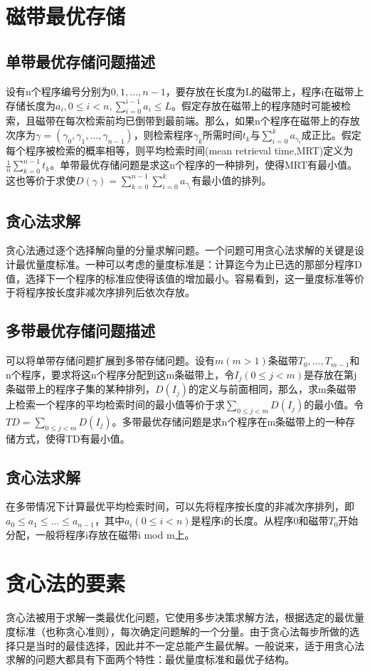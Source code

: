 \section{磁带最优存储}
\subsection*{单带最优存储问题描述}
设有n个程序编号分别为$0,1,\dots, n-1$，要存放在长度为L的磁带上，程序i在磁带上存储长度为$a_i,0\leq i<n,\sum_{i=0}^{i-1}a_i\leq L$。假定存放在磁带上的程序随时可能被检索，且磁带在每次检索前均已倒带到最前端。那么，如果n个程序在磁带上的存放次序为$\gamma=(\gamma_0,\gamma_1,\dots,\gamma_{n-1})$，则检索程序$\gamma_k$所需时间$t_k$与$\sum_{i=0}^{k}a_{\gamma_i}$成正比。假定每个程序被检索的概率相等，则平均检索时间(mean retrieval time,MRT)定义为$\frac{1}{n}\sum_{k=0}^{n-1}t_k$。单带最优存储问题是求这n个程序的一种排列，使得MRT有最小值。这也等价于求使$D(\gamma)=\sum_{k=0}^{n-1}\sum_{i=0}^{k}a_{\gamma_i}$有最小值的排列。
\subsection*{贪心法求解}
贪心法通过逐个选择解向量的分量求解问题。一个问题可用贪心法求解的关键是设计最优量度标准。一种可以考虑的量度标准是：计算迄今为止已选的那部分程序D值，选择下一个程序的标准应使得该值的增加最小。容易看到，这一量度标准等价于将程序按长度非减次序排列后依次存放。
\subsection*{多带最优存储问题描述}
可以将单带存储问题扩展到多带存储问题。设有$m(m>1)$条磁带$T_0,\dots,T_{m-1}$和n个程序，要求将这n个程序分配到这m条磁带上，令$I_j(0\leq j<m)$是存放在第j条磁带上的程序子集的某种排列，$D(I_j)$的定义与前面相同，那么，求m条磁带上检索一个程序的平均检索时间的最小值等价于求$\sum_{0\leq j<m}D(I_j)$的最小值。令$TD=\sum_{0\leq j<m}D(I_j)$。多带最优存储问题是求n个程序在m条磁带上的一种存储方式，使得TD有最小值。
\subsection*{贪心法求解}
在多带情况下计算最优平均检索时间，可以先将程序按长度的非减次序排列，即$a_0\leq a_1\leq \dots\leq a_{n-1}$，其中$a_i(0\leq i < n)$是程序i的长度。从程序0和磁带$T_0$开始分配，一般将程序i存放在磁带i mod m上。

\section{贪心法的要素}
贪心法被用于求解一类最优化问题，它使用多步决策求解方法，根据选定的最优量度标准（也称贪心准则），每次确定问题解的一个分量。由于贪心法每步所做的选择只是当时的最佳选择，因此并不一定总能产生最优解。一般说来，适于用贪心法求解的问题大都具有下面两个特性：最优量度标准和最优子结构。
